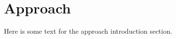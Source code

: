 \section{Approach}
\label{sec:introduction:approach}

Here is some text for the approach introduction section.

